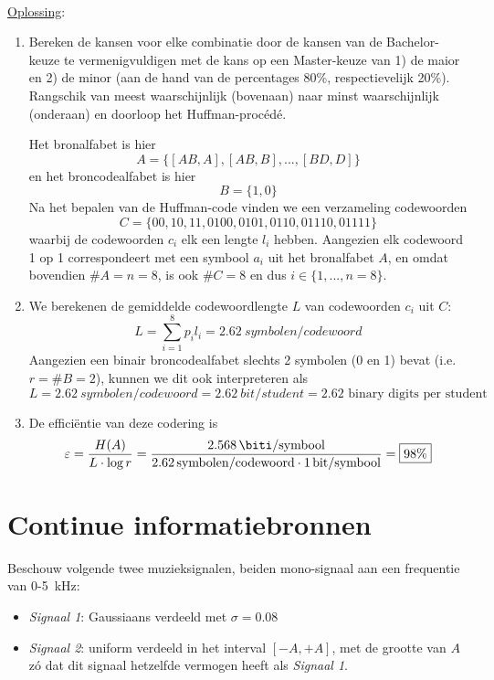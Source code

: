 \documentclass[kulak]{kulakarticle}
\let\epsilon\varepsilon
\begin{document}
	\hfill \\
	\underline{Oplossing}:
	\begin{enumerate}
		\item Bereken de kansen voor elke combinatie door de kansen van de Bachelor-keuze te vermenigvuldigen met de kans op een Master-keuze van 1) de maior en 2) de minor (aan de hand van de percentages 80\%, respectievelijk 20\%). Rangschik van meest waarschijnlijk (bovenaan) naar minst waarschijnlijk (onderaan) en doorloop het Huffman-procédé.

		Het bronalfabet is hier \[A=\{[AB,A],[AB,B],...,[BD,D]\}\] en het broncodealfabet is hier \[ B=\{1,0\} \] Na het bepalen van de Huffman-code vinden we een verzameling codewoorden \[ \boxed{C=\{00,10,11,0100,0101,0110,01110,01111\}} \] waarbij de codewoorden \(c_i\) elk een lengte \(l_i\) hebben. Aangezien elk codewoord 1 op 1 correspondeert met een symbool \(a_i\) uit het bronalfabet \(A\), en omdat bovendien \(\#A=n=8\), is ook \(\#C=8\) en dus \(i \in \{1,...,n=8\}\).

		\item We berekenen de gemiddelde codewoordlengte \(L\) van codewoorden \(c_i\) uit \(C\): \[ L=\sum_{i=1}^{8}p_il_i = \boxed{\SI{2.62}{symbolen/codewoord}} \]Aangezien een binair broncodealfabet slechts 2 symbolen (0 en 1) bevat (i.e. \(r=\#B=2\)), kunnen we dit ook interpreteren als \[L=\SI{2.62}{symbolen/codewoord}=\SI{2.62}{bit\per student}=2.62 \text{ binary digits per student} \]

		\item De efficiëntie van deze codering is \[\epsilon = \frac{H(A)}{L\cdot \log{r}}
		= \frac{\SI{2.568}{\biti \per symbool}}{\SI{2.62}{symbolen \per codewoord}\cdot \SI{1}{bit \per symbool}} = \boxed{98\%} \]
	\end{enumerate}

	\newpage

	\section{Continue informatiebronnen}

	Beschouw volgende twee muzieksignalen, beiden mono-signaal aan een frequentie van 0-\SI{5}{\kilo \hertz}:
	\begin{itemize}
		\item \textit{Signaal 1}: Gaussiaans verdeeld met \( \sigma=0.08 \)
		\item \textit{Signaal 2}: uniform verdeeld in het interval \( [-A,+A] \), met de grootte van \( A \) zó dat dit signaal hetzelfde vermogen heeft als \textit{Signaal 1}.
	\end{itemize}
\end{document}
